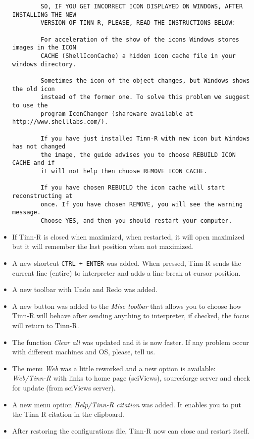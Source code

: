 \begin{itemize}
    \begin{footnotesize}
      \begin{verbatim}
        SO, IF YOU GET INCORRECT ICON DISPLAYED ON WINDOWS, AFTER INSTALLING THE NEW
        VERSION OF TINN-R, PLEASE, READ THE INSTRUCTIONS BELOW:

        For acceleration of the show of the icons Windows stores images in the ICON
        CACHE (ShellIconCache) a hidden icon cache file in your windows directory.

        Sometimes the icon of the object changes, but Windows shows the old icon
        instead of the former one. To solve this problem we suggest to use the
        program IconChanger (shareware available at http://www.shelllabs.com/).

        If you have just installed Tinn-R with new icon but Windows has not changed
        the image, the guide advises you to choose REBUILD ICON CACHE and if
        it will not help then choose REMOVE ICON CACHE.

        If you have chosen REBUILD the icon cache will start reconstructing at
        once. If you have chosen REMOVE, you will see the warning  message.
        Choose YES, and then you should restart your computer.
      \end{verbatim}
    \end{footnotesize}

  \item If Tinn-R is closed when maximized, when restarted, it will open
    maximized but it will remember the last position when not maximized.
  \item A new shortcut \texttt{CTRL + ENTER} was added. When pressed, Tinn-R
    sends the current line (entire) to \RR{} interpreter and adds a line break
    at cursor position.
  \item A new toolbar with Undo and Redo was added.
  \item A new button was added to the \textit{Misc toolbar} that allows
    you to choose how Tinn-R will behave after sending anything to \RR{}
    interpreter, if checked, the focus will return to Tinn-R.
  \item The function \textit{Clear all} was updated and it is now faster.
    If any problem occur with different machines and OS, please, tell us.
  \item The menu \textit{Web} was a little reworked and a new option is
    available: \textit{Web/Tinn-R} with links to home page (sciViews),
    sourceforge server and check for update (from sciViews server).
  \item A new menu option \textit{Help/Tinn-R citation} was added. It enables
    you to put the Tinn-R citation in the clipboard.
  \item After restoring the configurations file, Tinn-R now can
    close and restart itself.
\end{itemize}


